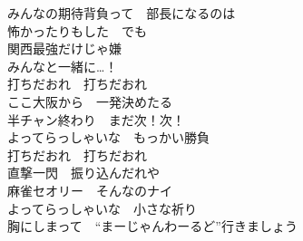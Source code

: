 {みんなの期待背負って　部長になるのは\\
怖かったりもした　でも\\
関西最強だけじゃ嫌\\
みんなと一緒に…！\\

打ちだおれ　打ちだおれ\\
ここ大阪から　一発決めたる\\
半チャン終わり　まだ次！次！\\
よってらっしゃいな　もっかい勝負\\
打ちだおれ　打ちだおれ\\
直撃一閃　振り込んだれや\\
麻雀セオリー　そんなのナイ\\
よってらっしゃいな　小さな祈り\\
胸にしまって　“まーじゃんわーるど”行きましょう
}
